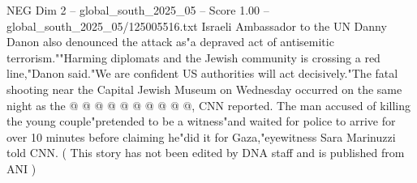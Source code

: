 \begin{textsample}{NEG Dim 2 – global\_south\_2025\_05 – Score 1.00 – global\_south\_2025\_05/125005516.txt}
Israeli Ambassador to the UN Danny Danon also denounced the attack as"a depraved act of antisemitic terrorism.""Harming diplomats and the Jewish community is crossing a red line,"Danon said."We are confident US authorities will act decisively."The fatal shooting near the Capital Jewish Museum on Wednesday occurred on the same night as the @ @ @ @ @ @ @ @ @ @, CNN reported.
The man accused of killing the young couple"pretended to be a witness"and waited for police to arrive for over 10 minutes before claiming he"did it for Gaza,"eyewitness Sara Marinuzzi told CNN. ( This story has not been edited by DNA staff and is published from ANI )

\end{textsample}
